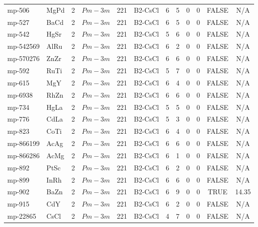 {\begin{longtable}{llcccccccccc}
    mp-506 & MgPd  & 2     & $Pm-3m$ & 221   & B2-CsCl & 6     & 5     & 0     & 0     & FALSE & N/A \\
    mp-527 & BaCd  & 2     & $Pm-3m$ & 221   & B2-CsCl & 6     & 5     & 0     & 0     & FALSE & N/A \\
    mp-542 & HgSr  & 2     & $Pm-3m$ & 221   & B2-CsCl & 5     & 6     & 0     & 0     & FALSE & N/A \\
    mp-542569 & AlRu  & 2     & $Pm-3m$ & 221   & B2-CsCl & 6     & 2     & 0     & 0     & FALSE & N/A \\
    mp-570276 & ZnZr  & 2     & $Pm-3m$ & 221   & B2-CsCl & 6     & 6     & 0     & 0     & FALSE & N/A \\
    mp-592 & RuTi  & 2     & $Pm-3m$ & 221   & B2-CsCl & 5     & 7     & 0     & 0     & FALSE & N/A \\
    mp-615 & MgY   & 2     & $Pm-3m$ & 221   & B2-CsCl & 6     & 4     & 0     & 0     & FALSE & N/A \\
    mp-6938 & RhZn  & 2     & $Pm-3m$ & 221   & B2-CsCl & 6     & 6     & 0     & 0     & FALSE & N/A \\
    mp-734 & HgLa  & 2     & $Pm-3m$ & 221   & B2-CsCl & 5     & 5     & 0     & 0     & FALSE & N/A \\
    mp-776 & CdLa  & 2     & $Pm-3m$ & 221   & B2-CsCl & 5     & 3     & 0     & 0     & FALSE & N/A \\
    mp-823 & CoTi  & 2     & $Pm-3m$ & 221   & B2-CsCl & 6     & 4     & 0     & 0     & FALSE & N/A \\
    mp-866199 & AcAg  & 2     & $Pm-3m$ & 221   & B2-CsCl & 6     & 6     & 0     & 0     & FALSE & N/A \\
    mp-866286 & AcMg  & 2     & $Pm-3m$ & 221   & B2-CsCl & 6     & 1     & 0     & 0     & FALSE & N/A \\
    mp-892 & PtSc  & 2     & $Pm-3m$ & 221   & B2-CsCl & 6     & 2     & 0     & 0     & FALSE & N/A \\
    mp-899 & InRh  & 2     & $Pm-3m$ & 221   & B2-CsCl & 6     & 6     & 0     & 0     & FALSE & N/A \\
    mp-902 & BaZn  & 2     & $Pm-3m$ & 221   & B2-CsCl & 6     & 9     & 0     & 0     & TRUE  & 14.35  \\
    mp-915 & CdY   & 2     & $Pm-3m$ & 221   & B2-CsCl & 6     & 2     & 0     & 0     & FALSE & N/A \\
    mp-22865 & CsCl  & 2     & $Pm-3m$ & 221   & B2-CsCl & 4     & 7     & 0     & 0     & FALSE & N/A \\

\end{longtable}}
